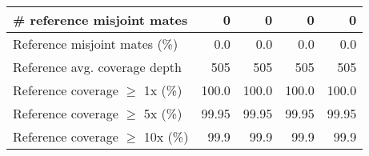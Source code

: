 \documentclass[12pt,a4paper]{article}
\begin{document}
\begin{table}[ht]
\begin{center}
\begin{tabular}{|l*{4}{|r}|}
\# reference misjoint mates & 0 & 0 & 0 & 0 \\ \hline
Reference misjoint mates (\%) & 0.0 & 0.0 & 0.0 & 0.0 \\ \hline
Reference avg. coverage depth & 505 & 505 & 505 & 505 \\ \hline
Reference coverage $\geq$ 1x (\%) & 100.0 & 100.0 & 100.0 & 100.0 \\ \hline
Reference coverage $\geq$ 5x (\%) & 99.95 & 99.95 & 99.95 & 99.95 \\ \hline
Reference coverage $\geq$ 10x (\%) & 99.9 & 99.9 & 99.9 & 99.9 \\ \hline
\end{tabular}
\end{center}
\end{table}
\end{document}
